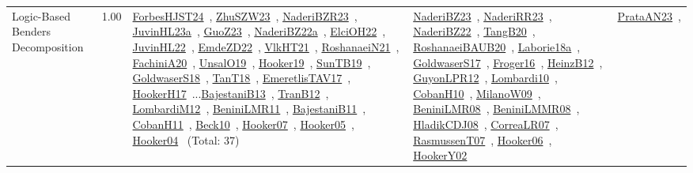 {\begin{longtable}{p{3cm}r>{\raggedright\arraybackslash}p{6cm}>{\raggedright\arraybackslash}p{6cm}>{\raggedright\arraybackslash}p{8cm}}
\index{Logic-Based Benders Decomposition}\index{Concepts!Logic-Based Benders Decomposition}Logic-Based Benders Decomposition &  1.00 & \href{../works/ForbesHJST24.pdf}{ForbesHJST24}~\cite{ForbesHJST24}, \href{../works/ZhuSZW23.pdf}{ZhuSZW23}~\cite{ZhuSZW23}, \href{../works/NaderiBZR23.pdf}{NaderiBZR23}~\cite{NaderiBZR23}, \href{../works/JuvinHL23a.pdf}{JuvinHL23a}~\cite{JuvinHL23a}, \href{../works/GuoZ23.pdf}{GuoZ23}~\cite{GuoZ23}, \href{../works/NaderiBZ22a.pdf}{NaderiBZ22a}~\cite{NaderiBZ22a}, \href{../works/ElciOH22.pdf}{ElciOH22}~\cite{ElciOH22}, \href{../works/JuvinHL22.pdf}{JuvinHL22}~\cite{JuvinHL22}, \href{../works/EmdeZD22.pdf}{EmdeZD22}~\cite{EmdeZD22}, \href{../works/VlkHT21.pdf}{VlkHT21}~\cite{VlkHT21}, \href{../works/RoshanaeiN21.pdf}{RoshanaeiN21}~\cite{RoshanaeiN21}, \href{../works/FachiniA20.pdf}{FachiniA20}~\cite{FachiniA20}, \href{../works/UnsalO19.pdf}{UnsalO19}~\cite{UnsalO19}, \href{../works/Hooker19.pdf}{Hooker19}~\cite{Hooker19}, \href{../works/SunTB19.pdf}{SunTB19}~\cite{SunTB19}, \href{../works/GoldwaserS18.pdf}{GoldwaserS18}~\cite{GoldwaserS18}, \href{../works/TanT18.pdf}{TanT18}~\cite{TanT18}, \href{../works/EmeretlisTAV17.pdf}{EmeretlisTAV17}~\cite{EmeretlisTAV17}, \href{../works/HookerH17.pdf}{HookerH17}~\cite{HookerH17}...\href{../works/BajestaniB13.pdf}{BajestaniB13}~\cite{BajestaniB13}, \href{../works/TranB12.pdf}{TranB12}~\cite{TranB12}, \href{../works/LombardiM12.pdf}{LombardiM12}~\cite{LombardiM12}, \href{../works/BeniniLMR11.pdf}{BeniniLMR11}~\cite{BeniniLMR11}, \href{../works/BajestaniB11.pdf}{BajestaniB11}~\cite{BajestaniB11}, \href{../works/CobanH11.pdf}{CobanH11}~\cite{CobanH11}, \href{../works/Beck10.pdf}{Beck10}~\cite{Beck10}, \href{../works/Hooker07.pdf}{Hooker07}~\cite{Hooker07}, \href{../works/Hooker05.pdf}{Hooker05}~\cite{Hooker05}, \href{../works/Hooker04.pdf}{Hooker04}~\cite{Hooker04} (Total: 37) & \href{../works/NaderiBZ23.pdf}{NaderiBZ23}~\cite{NaderiBZ23}, \href{../works/NaderiRR23.pdf}{NaderiRR23}~\cite{NaderiRR23}, \href{../works/NaderiBZ22.pdf}{NaderiBZ22}~\cite{NaderiBZ22}, \href{../works/TangB20.pdf}{TangB20}~\cite{TangB20}, \href{../works/RoshanaeiBAUB20.pdf}{RoshanaeiBAUB20}~\cite{RoshanaeiBAUB20}, \href{../works/Laborie18a.pdf}{Laborie18a}~\cite{Laborie18a}, \href{../works/GoldwaserS17.pdf}{GoldwaserS17}~\cite{GoldwaserS17}, \href{../works/Froger16.pdf}{Froger16}~\cite{Froger16}, \href{../works/HeinzB12.pdf}{HeinzB12}~\cite{HeinzB12}, \href{../works/GuyonLPR12.pdf}{GuyonLPR12}~\cite{GuyonLPR12}, \href{../works/Lombardi10.pdf}{Lombardi10}~\cite{Lombardi10}, \href{../works/CobanH10.pdf}{CobanH10}~\cite{CobanH10}, \href{../works/MilanoW09.pdf}{MilanoW09}~\cite{MilanoW09}, \href{../works/BeniniLMR08.pdf}{BeniniLMR08}~\cite{BeniniLMR08}, \href{../works/BeniniLMMR08.pdf}{BeniniLMMR08}~\cite{BeniniLMMR08}, \href{../works/HladikCDJ08.pdf}{HladikCDJ08}~\cite{HladikCDJ08}, \href{../works/CorreaLR07.pdf}{CorreaLR07}~\cite{CorreaLR07}, \href{../works/RasmussenT07.pdf}{RasmussenT07}~\cite{RasmussenT07}, \href{../works/Hooker06.pdf}{Hooker06}~\cite{Hooker06}, \href{../works/HookerY02.pdf}{HookerY02}~\cite{HookerY02} & \href{../works/PrataAN23.pdf}{PrataAN23}~\cite{PrataAN23}, 
\end{longtable}}
